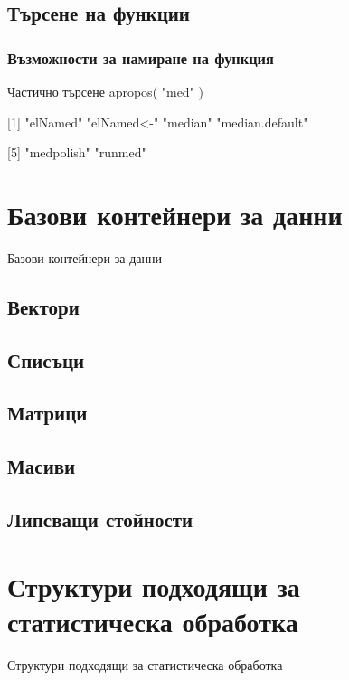 \documentclass{beamer}
\begin{document}
\subsection{Търсене на функции}

\begin{frame}
\frametitle{Възможности за намиране на функция}
\begin{block}{Частично търсене}
apropos( "med" )

[1] "elNamed"        "elNamed<-"      "median"         "median.default"

[5] "medpolish"      "runmed"
\end{block}
\end{frame}

\section{Базови контейнери за данни}

\begin{frame}
\center \huge{Базови контейнери за данни}
\end{frame}

\subsection{Вектори}

\subsection{Списъци}

\subsection{Матрици}

\subsection{Масиви}

\subsection{Липсващи стойности}

\section{Структури подходящи за статистическа обработка}

\begin{frame}
\center \huge{Структури подходящи за статистическа обработка}
\end{frame}
\end{document}
